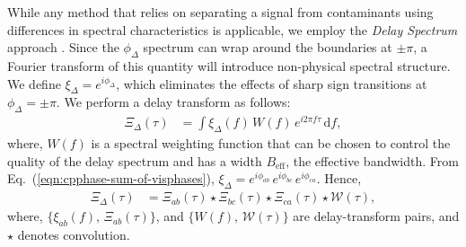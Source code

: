 \documentclass[
reprint,
superscriptaddress,
amsmath,
amssymb,
aps,
prd
]{revtex4-1}
\begin{document}
While any method that relies on separating a signal from contaminants using differences in spectral characteristics is applicable, we employ the {\it Delay Spectrum} approach \cite{par12a,par12b}. Since the $\phi_\Delta$ spectrum can wrap around the boundaries at $\pm\pi$, a Fourier transform of this quantity will introduce non-physical spectral structure. We define $\xi_\Delta = e^{i\phi_\Delta}$, which eliminates the effects of sharp sign transitions at $\phi_\Delta=\pm\pi$. We perform a delay transform as follows:
\begin{align}\label{eqn:cpdspec}
  \Xi_\Delta(\tau) &= \int \xi_\Delta(f)\,W(f)\,e^{i2\pi f\tau}\,\mathrm{d}f,
\end{align}
where, $W(f)$ is a spectral weighting function that can be chosen to control the quality of the delay spectrum \citep{thy13,thy16} and has a width $B_\textrm{eff}$, the effective bandwidth. From Eq.~(\ref{eqn:cpphase-sum-of-visphases}), $\xi_\Delta = e^{i\phi_{ab}}\,e^{i\phi_{bc}}\,e^{i\phi_{ca}}$. Hence,
\begin{align}
  \Xi_\Delta(\tau) &= \Xi_{ab}(\tau) \star \Xi_{bc}(\tau) \star \Xi_{ca}(\tau) \star \mathcal{W}(\tau), \label{eqn:cpdspec-convolution}
\end{align}
where, $\{\xi_{ab}(f),\,\Xi_{ab}(\tau)\}$, and $\{W(f),\,\mathcal{W}(\tau)\}$ are delay-transform pairs, and $\star$ denotes convolution. 
\end{document}
